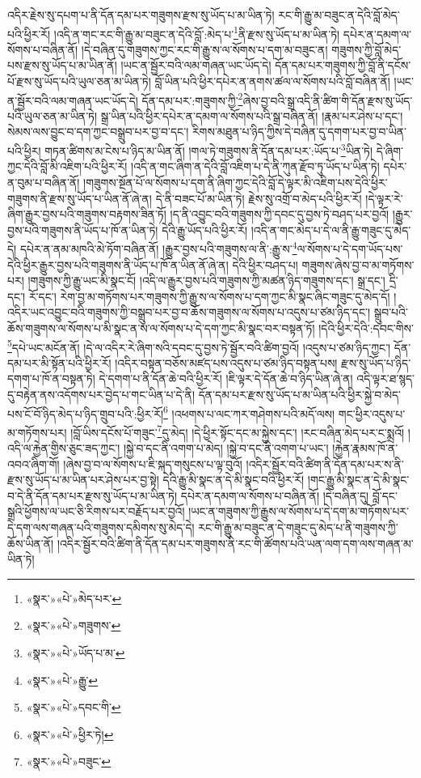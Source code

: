 འདིར་རྗེས་སུ་དཔག་པ་ནི་དོན་དམ་པར་གཟུགས་རྫས་སུ་ཡོད་པ་མ་ཡིན་ཏེ། རང་གི་རྒྱུ་མ་བཟུང་ན་དེའི་བློ་མེད་པའི་ཕྱིར་རོ། །འདི་ན་གང་རང་གི་རྒྱུ་མ་བཟུང་ན་དེའི་བློ་:མེད་པ་\footnote{«སྣར་»«པེ་»མེད་པར་}ནི་རྫས་སུ་ཡོད་པ་མ་ཡིན་ཏེ། དཔེར་ན་དམག་ལ་སོགས་པ་བཞིན་ནོ། །དེ་བཞིན་དུ་གཟུགས་ཀྱང་རང་གི་རྒྱུ་ས་ལ་སོགས་པ་དག་མ་བཟུང་ན། གཟུགས་ཀྱི་བློ་མེད་པས་རྫས་སུ་ཡོད་པ་མ་ཡིན་ནོ། །ཡང་ན་སྦྱོར་བའི་ལམ་གཞན་ཡང་ཡོད་དེ། དོན་དམ་པར་གཟུགས་ཀྱི་བློ་ནི་དངོས་པོ་རྫས་སུ་ཡོད་པའི་ཡུལ་ཅན་མ་ཡིན་ཏེ། བློ་ཡིན་པའི་ཕྱིར་དཔེར་ན་ནགས་ཚལ་ལ་སོགས་པའི་བློ་བཞིན་ནོ། །ཡང་ན་སྦྱོར་བའི་ལམ་གཞན་ཡང་ཡོད་དེ། དོན་དམ་པར་:གཟུགས་ཀྱི་\footnote{«སྣར་»«པེ་»གཟུགས་}ཞེས་བྱ་བའི་སྒྲ་འདི་ནི་ཚིག་གི་དོན་རྫས་སུ་ཡོད་པའི་ཡུལ་ཅན་མ་ཡིན་ཏེ། སྒྲ་ཡིན་པའི་ཕྱིར་དཔེར་ན་དམག་ལ་སོགས་པའི་སྒྲ་བཞིན་ནོ། །རྣམ་པར་ཤེས་པ་དང་། སེམས་ལས་བྱུང་བ་དག་ཀྱང་བསྒྲུབ་པར་བྱ་བ་དང་། རིགས་མཐུན་པ་ཉིད་ཀྱིས་དེ་བཞིན་དུ་དགག་པར་བྱ་བ་ཡིན་པའི་ཕྱིར། གཏན་ཚིགས་མ་ངེས་པ་ཉིད་མ་ཡིན་ནོ། །གལ་ཏེ་གཟུགས་ནི་དོན་དམ་པར་:ཡོད་པ་\footnote{«སྣར་»«པེ་»ཡོད་པ་མ་}ཡིན་ཏེ། དེ་ཞིག་ཀྱང་དེའི་བློ་མི་འཇིག་པའི་ཕྱིར་རོ། །འདི་ན་གང་ཞིག་ན་དེའི་བློ་འཇིག་པ་དེ་ནི་ཀུན་རྫོབ་ཏུ་ཡོད་པ་ཡིན་ཏེ། དཔེར་ན་བུམ་པ་བཞིན་ནོ། །གཟུགས་སྔོན་པོ་ལ་སོགས་པ་དག་ནི་ཞིག་ཀྱང་དེའི་བློ་དེ་ལྟར་མི་འཇིག་པས་དེའི་ཕྱིར་གཟུགས་ནི་རྫས་སུ་ཡོད་པ་ཡིན་ནོ་ཞེ་ན། དེ་ནི་བཟང་པོ་མ་ཡིན་ཏེ། རྗེས་སུ་འགྲོ་བ་མེད་པའི་ཕྱིར་རོ། །དེ་ལྟར་རེ་ཞིག་རྒྱུར་བྱས་པའི་གཟུགས་བརྟགས་ཟིན་ཏོ། །ད་ནི་འབྱུང་བའི་གཟུགས་ཀྱི་དབང་དུ་བྱས་ཏེ་བཤད་པར་བྱའོ། །རྒྱུར་བྱས་པའི་གཟུགས་ནི་ཡོད་པ་ཁོ་ན་ཡིན་ཏེ། དེའི་རྒྱུ་ཡོད་པའི་ཕྱིར་རོ། །འདི་ན་གང་མེད་པ་དེ་ལ་ནི་རྒྱུ་གཟུང་དུ་མེད་དེ། དཔེར་ན་ནམ་མཁའི་མེ་ཏོག་བཞིན་ནོ། །རྒྱུར་བྱས་པའི་གཟུགས་ལ་ནི་:རྒྱུ་ས་\footnote{«སྣར་»«པེ་»རྒྱུ་}ལ་སོགས་པ་དེ་དག་ཡོད་པས་དེའི་ཕྱིར་རྒྱུར་བྱས་པའི་གཟུགས་ནི་ཡོད་པ་ཁོ་ན་ཡིན་ནོ་ཞེ་ན། དེའི་ཕྱིར་བཤད་པ། གཟུགས་ཞེས་བྱ་བ་མ་གཏོགས་པར། །གཟུགས་ཀྱི་རྒྱུ་ཡང་མི་སྣང་ངོ། །འདི་ལ་རྒྱུར་བྱས་པའི་གཟུགས་ཀྱི་མཚན་ཉིད་གཟུགས་དང་། སྒྲ་དང་། དྲི་དང་། རོ་དང་། རེག་བྱ་མ་གཏོགས་པར་གཟུགས་ཀྱི་རྒྱུ་ས་ལ་སོགས་པ་དག་ཀྱང་མི་སྣང་ཞིང་གཟུང་དུ་མེད་དོ། །འདིར་ཡང་འབྱུང་བའི་གཟུགས་ཀྱི་བསྒྲུབ་པར་བྱ་བ་ཆོས་གཟུགས་ལ་སོགས་པ་འདུས་པ་ཙམ་ཉིད་དང་། སྒྲུབ་པའི་ཆོས་གཟུགས་ལ་སོགས་པ་མི་སྣང་ན་ས་ལ་སོགས་པ་དེ་དག་ཀྱང་མི་སྣང་བར་བསྟན་ཏོ། །དེའི་ཕྱིར་དེའི་:དབང་གིས་\footnote{«སྣར་»«པེ་»དབང་གི་}དཔེ་ཡང་མངོན་ནོ། །དེ་ལ་འདིར་རེ་ཞིག་སའི་དབང་དུ་བྱས་ཏེ་སྦྱོར་བའི་ཚིག་བྱའོ། །འདུས་པ་ཙམ་ཉིད་ཀྱང་། དོན་དམ་པར་མི་སྟོན་པའི་ཕྱིར་རོ། །འདིར་བསྟན་བཅོས་མཛད་པས་འདུས་པ་ཙམ་ཉིད་བསྟན་པས། རྫས་སུ་ཡོད་པ་ཉིད་དགག་པ་ཁོ་ན་བསྟན་ཏེ། དེ་དགག་པ་ནི་དོན་ཆེ་བའི་ཕྱིར་རོ། །ཇི་ལྟར་དེ་དོན་ཆེ་བ་ཉིད་ཡིན་ཞེ་ན། འདི་ལྟར་ཐ་སྙད་དུ་བརྟེན་ནས་འདོགས་པར་བྱེད་པ་གང་ཡིན་པ་དེ་ནི། དོན་དམ་པར་རྫས་སུ་ཡོད་པ་མ་ཡིན་པའི་ཕྱིར་སྐྱེ་བ་མེད་པས་ངོ་བོ་ཉིད་མེད་པ་ཉིད་གྲུབ་པའི་:ཕྱིར་རོ།\footnote{«སྣར་»«པེ་»ཕྱིར་ཏེ།} །འཕགས་པ་ལང་ཀར་གཤེགས་པའི་མདོ་ལས། གང་ཕྱིར་འདུས་པ་མ་གཏོགས་པར། །བློ་ཡིས་དངོས་པོ་གཟུང་\footnote{«སྣར་»«པེ་»བཟུང་}དུ་མེད། །དེ་ཕྱིར་སྟོང་དང་མ་སྐྱེས་དང་། །རང་བཞིན་མེད་པར་ང་སྨྲའོ། །འདི་ལ་རྐྱེན་གྱིས་ཅུང་ཟད་ཀྱང་། །སྐྱེ་བ་དང་ནི་འགག་པ་མེད། །སྐྱེ་བ་དང་ནི་འགག་པ་ཡང་། །རྐྱེན་རྣམས་ཁོ་ན་འབའ་ཞིག་གོ། །ཞེས་བྱ་བ་ལ་སོགས་པ་ཇི་སྐད་གསུངས་པ་ལྟ་བུའོ། །འདིར་སྦྱོར་བའི་ཚིག་ནི་དོན་དམ་པར་ས་ནི་རྫས་སུ་ཡོད་པ་མ་ཡིན་པར་ཤེས་པར་བྱ་སྟེ། དེའི་རྒྱུ་མི་སྣང་ན་དེ་མི་སྣང་བའི་ཕྱིར་རོ། །གང་རྒྱུ་མི་སྣང་ན་དེ་མི་སྣང་བ་དེ་ནི་དོན་དམ་པར་རྫས་སུ་ཡོད་པ་མ་ཡིན་ཏེ། དཔེར་ན་དམག་ལ་སོགས་པ་བཞིན་ནོ། །དེ་བཞིན་དུ། བློ་དང་སྒྲའི་ཕྱོགས་ལ་ཡང་ཅི་རིགས་པར་བརྗོད་པར་བྱའོ། །ཡང་ན་གཟུགས་ཀྱི་རྒྱུས་ལ་སོགས་པ་དེ་དག་མ་གཏོགས་པར་དེ་དག་ལས་གཞན་པའི་གཟུགས་དམིགས་སུ་མེད་དེ། རང་གི་རྒྱུ་མ་བཟུང་ན་དེ་གཟུང་དུ་མེད་པ་ནི་གཟུགས་ཀྱི་ཆོས་ཡིན་ནོ། །འདིར་སྦྱོར་བའི་ཚིག་ནི་དོན་དམ་པར་གཟུགས་ནི་རང་གི་ཚོགས་པའི་ཡན་ལག་དག་ལས་གཞན་མ་ཡིན་ཏེ། 